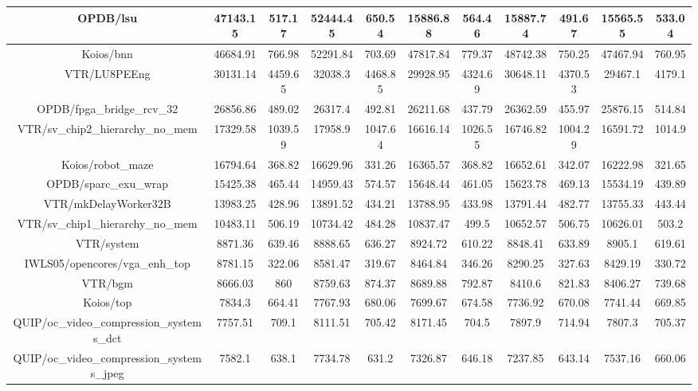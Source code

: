 {\begin{longtable}{|*{11}{c|}}
        \hline
        OPDB/lsu & 47143.15 & 517.17 & 52444.45 & 650.54 & 15886.88 & 564.46 & 15887.74 & 491.67 & 15565.55 & 533.04 \\
        \hline
        Koios/bnn & 46684.91 & 766.98 & 52291.84 & 703.69 & 47817.84 & 779.37 & 48742.38 & 750.25 & 47467.94 & 760.95 \\
        \hline
        VTR/LU8PEEng & 30131.14 & 4459.65 & 32038.3 & 4468.85 & 29928.95 & 4324.69 & 30648.11 & 4370.53 & 29467.1 & 4179.1 \\
        \hline
        OPDB/fpga\_bridge\_rcv\_32 & 26856.86 & 489.02 & 26317.4 & 492.81 & 26211.68 & 437.79 & 26362.59 & 455.97 & 25876.15 & 514.84 \\
        \hline
        VTR/sv\_chip2\_hierarchy\_no\_mem & 17329.58 & 1039.59 & 17958.9 & 1047.64 & 16616.14 & 1026.55 & 16746.82 & 1004.29 & 16591.72 & 1014.9 \\
        \hline
        Koios/robot\_maze & 16794.64 & 368.82 & 16629.96 & 331.26 & 16365.57 & 368.82 & 16652.61 & 342.07 & 16222.98 & 321.65 \\
        \hline
        OPDB/sparc\_exu\_wrap & 15425.38 & 465.44 & 14959.43 & 574.57 & 15648.44 & 461.05 & 15623.78 & 469.13 & 15534.19 & 439.89 \\
        \hline
        VTR/mkDelayWorker32B & 13983.25 & 428.96 & 13891.52 & 434.21 & 13788.95 & 433.98 & 13791.44 & 482.77 & 13755.33 & 443.44 \\
        \hline
        VTR/sv\_chip1\_hierarchy\_no\_mem & 10483.11 & 506.19 & 10734.42 & 484.28 & 10837.47 & 499.5 & 10652.57 & 506.75 & 10626.01 & 503.2 \\
        \hline
        VTR/system & 8871.36 & 639.46 & 8888.65 & 636.27 & 8924.72 & 610.22 & 8848.41 & 633.89 & 8905.1 & 619.61 \\
        \hline
        IWLS05/opencores/vga\_enh\_top & 8781.15 & 322.06 & 8581.47 & 319.67 & 8464.84 & 346.26 & 8290.25 & 327.63 & 8429.19 & 330.72 \\
        \hline
        VTR/bgm & 8666.03 & 860 & 8759.63 & 874.37 & 8689.88 & 792.87 & 8410.6 & 821.83 & 8406.27 & 739.68 \\
        \hline
        Koios/top & 7834.3 & 664.41 & 7767.93 & 680.06 & 7699.67 & 674.58 & 7736.92 & 670.08 & 7741.44 & 669.85 \\
        \hline
        QUIP/oc\_video\_compression\_systems\_dct & 7757.51 & 709.1 & 8111.51 & 705.42 & 8171.45 & 704.5 & 7897.9 & 714.94 & 7807.3 & 705.37 \\
        \hline
        QUIP/oc\_video\_compression\_systems\_jpeg & 7582.1 & 638.1 & 7734.78 & 631.2 & 7326.87 & 646.18 & 7237.85 & 643.14 & 7537.16 & 660.06 \\

\end{longtable}}
